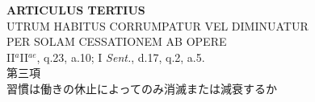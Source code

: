 \documentclass[paper=a4paper,fontsize=10pt,jafontsize=9pt,titlepage]{jlreq}
\begin{document}
\newpage
{}
{}
\setcounter{section}{3}
\setcounter{subsection}{0}




\begin{center}
{\Large {\bfseries ARTICULUS TERTIUS}}\\ {\large UTRUM HABITUS CORRUMPATUR
VEL DIMINUATUR\\PER SOLAM CESSATIONEM AB OPERE }\\ {\footnotesize
II$^{a}$II$^{ae}$, q.23, a.10; I {\itshape Sent.}, d.17, q.2, a.5.}\\
{\Large 第三項\\習慣は働きの休止によってのみ消滅または減衰するか}
\end{center}
\end{document}
